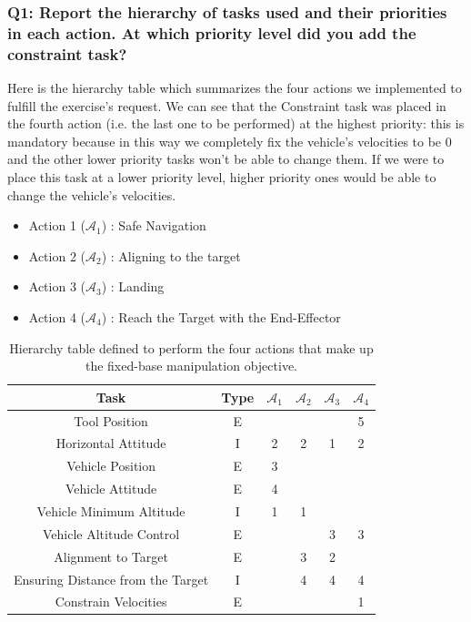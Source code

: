 \documentclass{article}
\begin{document}
\subsubsection{Q1: Report the hierarchy of tasks used and their priorities in each action. At which priority level did you add the constraint task?}
Here is the hierarchy table which summarizes the four actions we implemented to fulfill the exercise's request. We can see that the Constraint task was placed in the fourth action (i.e. the last one to be performed) at the highest priority: this is mandatory because in this way we completely fix the vehicle's velocities to be 0 and the other lower priority tasks won't be able to change them. If we were to place this task at a lower priority level, higher priority ones would be able to change the vehicle's velocities.
\begin{table}[htb]
	\caption{Hierarchy table defined to perform the four actions that make up the fixed-base manipulation objective.}
	\begin{itemize}
		\item Action 1 ($\mathcal{A}_{1}$) : Safe Navigation
		\item Action 2 ($\mathcal{A}_{2}$) : Aligning to the target
		\item Action 3 ($\mathcal{A}_{3}$) : Landing
		\item Action 4 ($\mathcal{A}_{4}$) : Reach the Target with the End-Effector
	\end{itemize}
	\label{tb5:ex4.1.1HierarchyTable}
	\begin{center}
		\footnotesize
		\begin{tabular}{cccccc}
			\toprule
			Task & Type & $\mathcal{A}_{1}$ & $\mathcal{A}_{2}$ & $\mathcal{A}_{3}$ & $\mathcal{A}_{4}$ \\
			\midrule
			Tool Position                     & E &   &   &   & 5 \\
			\hdashline
			Horizontal Attitude               & I & 2 & 2 & 1 & 2 \\
			\hdashline
			Vehicle Position                  & E & 3 &   &   &   \\
			\hdashline
			Vehicle Attitude                  & E & 4 &   &   &   \\
			\hdashline
			Vehicle Minimum Altitude          & I & 1 & 1 &   &   \\
			\hdashline
			Vehicle Altitude Control          & E &   &   & 3 & 3 \\
			\hdashline
			Alignment to Target               & E &   & 3 & 2 &   \\
			\hdashline
			Ensuring Distance from the Target & I &   & 4 & 4 & 4 \\
			\hdashline
			Constrain Velocities              & E &   &   &   & 1 \\
			\bottomrule
		\end{tabular}
	\end{center}
\end{table}
\end{document}
